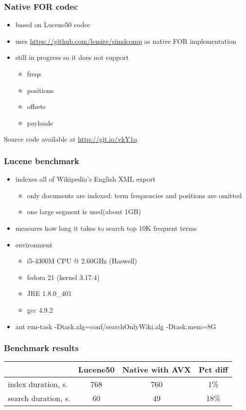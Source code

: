 \documentclass{beamer}
\begin{document}
	\begin{frame}
		\frametitle{Native FOR codec}
		\begin{itemize}
		    \item based on Lucene50 codec
		    \item uses \url{https://github.com/lemire/simdcomp} as native FOR implementation
			\item still in progress so it does not support
			\begin{itemize}
				\item freqs
				\item positions
				\item offsets
				\item payloads
			\end{itemize}			
		\end{itemize}
		Source code available at \url{http://git.io/vkY1o}
	\end{frame}
	\begin{frame}
		\frametitle{Lucene benchmark}
		\begin{itemize}
			\item indexes all of Wikipedia's English XML export
				\begin{itemize}
					\item only documents are indexed: term frequencies and positions are omitted
					\item one large segment is used(about 1GB)
				\end{itemize}
			\item measures how long it takes to search top 10K frequent terms
			\item environment
			\begin{itemize}
				\item i5-4300M CPU @ 2.60GHz (Haswell)
				\item fedora 21 (kernel 3.17.4)
				\item JRE 1.8.0\_401
				\item gcc 4.9.2 
			\end{itemize}
			\item ant run-task -Dtask.alg=conf/searchOnlyWiki.alg -Dtask.mem=8G
		\end{itemize}
	\end{frame}
	\begin{frame}
		\frametitle{Benchmark results}
		\begin{center}
 			\begin{tabular}{|l|c c c|} 
 				\hline
 				& Lucene50 & Native with AVX & Pct diff\\ [0.5ex] 
 				\hline 
				index duration, s. & 768 & 760 & 1\%\\
 				\hline
 				search duration, s. & 60 & 49  & 18\%\\
 				\hline
			\end{tabular}
		\end{center}	
	\end{frame}
\end{document}
